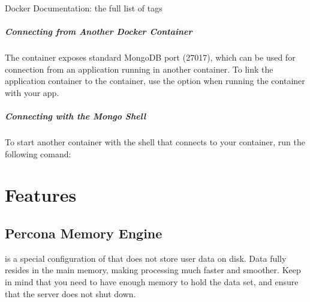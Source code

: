 \documentclass[letterpaper,10pt,english]{sphinxmanual}
\begin{document}
\nopagebreak

\begin{description}
\item[{Docker Documentation: the full list of tags}] \leavevmode
\sphinxAtStartPar
{}

\end{description}




\subsubsection{Connecting from Another Docker Container}
\label{\detokenize{install/docker:connecting-from-another-docker-container}}
\sphinxAtStartPar
The  container exposes standard MongoDB port (27017),
which can be used for connection from an application
running in another container.
To link the application container to the  container,
use the  option when running the container with your app.


\subsubsection{Connecting with the Mongo Shell}
\label{\detokenize{install/docker:connecting-with-the-mongo-shell}}
\sphinxAtStartPar
To start another container with the  shell
that connects to your  container,
run the following comand: 


\part{Features}
\label{\detokenize{index:features}}

\chapter{Percona Memory Engine}
\label{\detokenize{inmemory:percona-memory-engine}}\label{\detokenize{inmemory:inmemory}}\label{\detokenize{inmemory::doc}}
\sphinxAtStartPar
{} is a special configuration of  that does
not store user data on disk.  Data fully resides in the main memory, making
processing much faster and smoother.  Keep in mind that you need to have enough
memory to hold the data set, and ensure that the server does not shut down.
\end{document}
